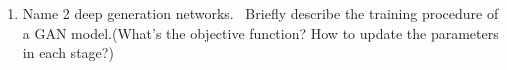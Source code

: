 \documentclass[10pt]{article}
\begin{document}
\begin{enumerate}[1.]
(a)



(b)



(c)



		 
		 
		 
		\newpage


	\item {} Name 2 deep generation networks.~ Briefly describe the training procedure of a GAN model.(What's the objective function? How to update the parameters in each stage?)~\\

	
	



\end{enumerate}
\end{document}
